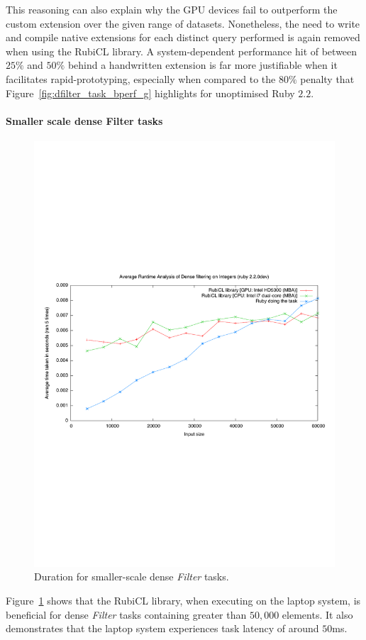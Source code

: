 This reasoning can also explain why the \ac{GPU} devices fail to outperform the custom extension over the given range of datasets.
Nonetheless, the need to write and compile native extensions for each distinct query performed is again removed when using the RubiCL library. A system-dependent performance hit of between $25\%$ and $50\%$ behind a handwritten extension is far more justifiable when it facilitates rapid-prototyping, especially when compared to the $80\%$ penalty that Figure~\ref{fig:dfilter_task_bperf_g} highlights for unoptimised Ruby $2.2$.

\paragraph*{Smaller scale dense Filter tasks}
\begin{figure}[H]
  \includegraphics[trim=0cm 8cm 0cm 8cm, clip=true, width=\textwidth]{./graphing/smalldensefilter.pdf}
  \caption{Duration for smaller-scale dense \emph{Filter} tasks.}
  \label{fig:densefil_tasksmallrun}
\end{figure}
Figure~\ref{fig:densefil_tasksmallrun} shows that the RubiCL library, when executing on the laptop system, is beneficial for dense \emph{Filter} tasks containing greater than $50,000$ elements. It also demonstrates that the laptop system experiences task latency of around $50$ms.

